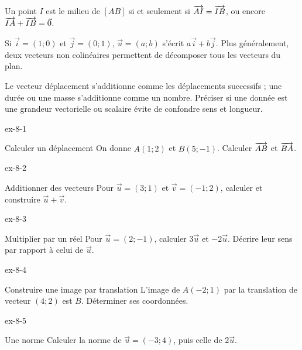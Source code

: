 \begin{propriete}Un point $I$ est le milieu de $[AB]$ si et seulement si $\overrightarrow{AI}=\overrightarrow{IB}$, ou encore $\overrightarrow{IA}+\overrightarrow{IB}=\vec0$.\end{propriete}
\begin{savoirfaire}Si $\vec i=(1;0)$ et $\vec j=(0;1)$, $\vec u=(a;b)$ s’écrit $a\vec i+b\vec j$. Plus généralement, deux vecteurs non colinéaires permettent de décomposer tous les vecteurs du plan.\end{savoirfaire}
Le vecteur déplacement s’additionne comme les déplacements successifs ; une durée ou une masse s’additionne comme un nombre. Préciser si une donnée est une grandeur vectorielle ou scalaire évite de confondre sens et longueur.
\clearpage{}
\begin{blocLivre}{ex-8-1}
\begin{exercice}[1]{Calculer un déplacement}
On donne $A(1;2)$ et $B(5;-1)$. Calculer $\overrightarrow{AB}$ et $\overrightarrow{BA}$.
\label{fig-ex-8-1}
\end{exercice}
\end{blocLivre}
\begin{blocLivre}{ex-8-2}
\begin{exercice}[1]{Additionner des vecteurs}
Pour $\vec u=(3;1)$ et $\vec v=(-1;2)$, calculer et construire $\vec u+\vec v$.
\label{fig-ex-8-2}
\end{exercice}
\end{blocLivre}
\begin{blocLivre}{ex-8-3}
\begin{exercice}[1]{Multiplier par un réel}
Pour $\vec u=(2;-1)$, calculer $3\vec u$ et $-2\vec u$. Décrire leur sens par rapport à celui de $\vec u$.
\label{fig-ex-8-3}
\end{exercice}
\end{blocLivre}
\begin{blocLivre}{ex-8-4}
\begin{exercice}[1]{Construire une image par translation}
L’image de $A(-2;1)$ par la translation de vecteur $(4;2)$ est $B$. Déterminer ses coordonnées.
\label{fig-ex-8-4}
\end{exercice}
\end{blocLivre}
\begin{blocLivre}{ex-8-5}
\begin{exercice}[1]{Une norme}
Calculer la norme de $\vec u=(-3;4)$, puis celle de $2\vec u$.
\label{fig-ex-8-5}
\end{exercice}
\end{blocLivre}

